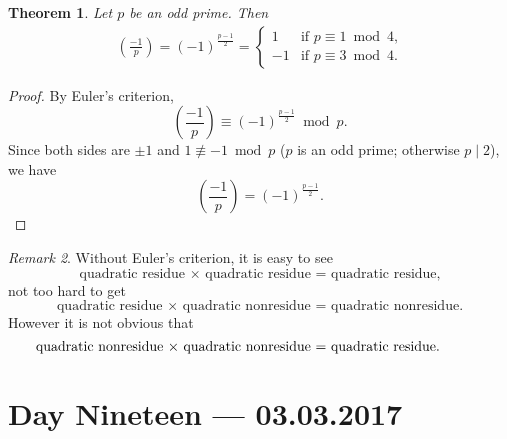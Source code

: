 \documentclass{amsbook}
\theoremstyle{plain}
\newtheorem{theorem}{Theorem}[chapter] %
\theoremstyle{definition}
\theoremstyle{remark}
\newtheorem{remark}[theorem]{Remark}
\numberwithin{equation}{chapter}
\numberwithin{figure}{chapter}
\begin{document}
\begin{theorem}\label{thm:qr_1st_supp}
  Let $p$ be an odd prime. Then
  \begin{align}
    \left( \frac{-1}p \right) = (-1)^{\frac{p-1}2} = \left\{ \begin{array}{rl}
                                                               1 & \text{if $p \equiv 1 \bmod 4$,} \\[2mm]
                                                               -1 & \text{if $p \equiv 3 \bmod 4$.}
                                                             \end{array} \right.
  \end{align}
\end{theorem}
\begin{proof}
  By Euler's criterion,
  \[
    \left( \frac{-1}p \right) \equiv (-1)^{\frac{p-1}2} \bmod p.
  \]
  Since both sides are $\pm 1$ and $1 \not\equiv -1 \bmod p$ ($p$ is an odd prime; otherwise $p \mid 2$), we have
  \[
    \left( \frac{-1}p \right) = (-1)^{\frac{p-1}2}.
  \]
\end{proof}
\begin{remark}
  Without Euler's criterion, it is easy to see
  \[
    \text{quadratic residue $\times$ quadratic residue = quadratic residue,}
  \]
  not too hard to get 
  \[
    \text{quadratic residue $\times$ quadratic nonresidue = quadratic nonresidue.}
  \]
  However it is not obvious that
  \[
    \hspace{-11mm} \text{quadratic nonresidue $\times$ quadratic nonresidue = quadratic residue.}
  \]
\end{remark}

\chapter[Lecture Nineteen]{Day Nineteen \hfill {\footnotesize \rm --- 03.03.2017}}
\end{document}
